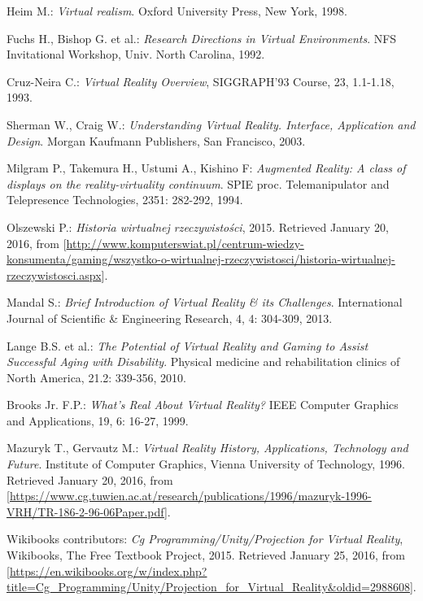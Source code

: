 \begin{thebibliography}{99}
\setlength{\bibsep}{0pt plus 0.3ex}
 Heim M.: \emph{Virtual realism}. Oxford University Press, New York, 1998.

 Fuchs H., Bishop G. et al.: \emph{Research Directions in Virtual Environments}. NFS
Invitational Workshop, Univ. North Carolina, 1992.

 Cruz-Neira C.: \emph{Virtual Reality Overview}, SIGGRAPH’93 Course, 23, 1.1-1.18, 1993.

 Sherman W., Craig W.: \emph{Understanding Virtual Reality. Interface, Application and Design}. Morgan Kaufmann Publishers, San Francisco, 2003.

 Milgram P., Takemura H., Ustumi A., Kishino F: \emph{Augmented Reality: A class of displays on the reality-virtuality continuum}. SPIE proc. Telemanipulator and Telepresence Technologies, 2351: 282-292, 1994.

 Olszewski P.: \emph{Historia wirtualnej rzeczywistości}, 2015. Retrieved January 20, 2016, from [\url{http://www.komputerswiat.pl/centrum-wiedzy-konsumenta/gaming/wszystko-o-wirtualnej-rzeczywistosci/historia-wirtualnej-rzeczywistosci.aspx}].

 Mandal S.: \emph{Brief Introduction of Virtual Reality \& its Challenges}. International Journal of Scientific \& Engineering Research, 4, 4: 304-309, 2013.

 Lange B.S. et al.: \emph{The Potential of Virtual Reality and Gaming to Assist Successful Aging with Disability}. Physical medicine and rehabilitation clinics of North America, 21.2: 339-356, 2010.

 Brooks Jr. F.P.: \emph{What’s Real About Virtual Reality?} IEEE Computer Graphics and Applications, 19, 6: 16-27, 1999.

 Mazuryk T., Gervautz M.: \emph{Virtual Reality History, Applications, Technology and Future}. Institute of Computer Graphics, Vienna University of Technology, 1996. Retrieved January 20, 2016, from [\url{https://www.cg.tuwien.ac.at/research/publications/1996/mazuryk-1996-VRH/TR-186-2-96-06Paper.pdf}].

 Wikibooks contributors: \emph{Cg Programming/Unity/Projection for Virtual Reality}, Wikibooks, The Free Textbook Project, 2015. Retrieved January 25, 2016, from [\url{https://en.wikibooks.org/w/index.php?title=Cg_Programming/Unity/Projection_for_Virtual_Reality&oldid=2988608}].


\end{thebibliography}
